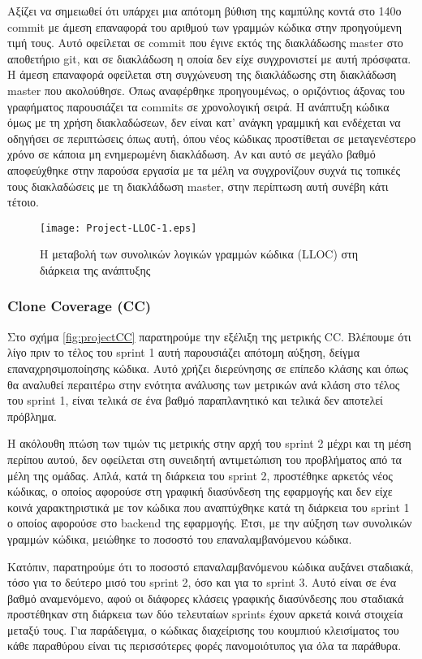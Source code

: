 Αξίζει να σημειωθεί ότι υπάρχει μια απότομη βύθιση της καμπύλης
κοντά στο 140ο commit με άμεση επαναφορά του αριθμού των γραμμών
κώδικα στην προηγούμενη τιμή τους. Αυτό οφείλεται σε commit που
έγινε εκτός της διακλάδωσης master στο αποθετήριο git, και σε
διακλάδωση η οποία δεν είχε συγχρονιστεί με αυτή πρόσφατα. Η
άμεση επαναφορά οφείλεται στη συγχώνευση της διακλάδωσης στη
διακλάδωση master που ακολούθησε. Όπως αναφέρθηκε προηγουμένως, ο
οριζόντιος άξονας του γραφήματος παρουσιάζει τα commits σε
χρονολογική σειρά. Η ανάπτυξη κώδικα όμως με τη χρήση
διακλαδώσεων, δεν είναι κατ’ ανάγκη γραμμική και ενδέχεται να
οδηγήσει σε περιπτώσεις όπως αυτή, όπου νέος κώδικας προστίθεται
σε μεταγενέστερο χρόνο σε κάποια μη ενημερωμένη διακλάδωση. Αν
και αυτό σε μεγάλο βαθμό αποφεύχθηκε στην παρούσα εργασία με τα
μέλη να συγχρονίζουν συχνά τις τοπικές τους διακλαδώσεις με τη
διακλάδωση master, στην περίπτωση αυτή συνέβη κάτι τέτοιο.

\begin{figure}
\centering
\texttt{[image: Project-LLOC-1.eps]}
\caption{Η μεταβολή των συνολικών λογικών γραμμών κώδικα (LLOC) στη διάρκεια της ανάπτυξης}
\label{fig:projectLLOC}
\end{figure}

\subsubsection{Clone Coverage (CC)}

Στο σχήμα \ref{fig:projectCC} παρατηρούμε την εξέλιξη της μετρικής CC.
Βλέπουμε ότι λίγο πριν το τέλος του sprint 1 αυτή παρουσιάζει απότομη
αύξηση, δείγμα επαναχρησιμοποίησης κώδικα. Αυτό χρήζει διερεύνησης σε
επίπεδο κλάσης και όπως θα αναλυθεί περαιτέρω στην ενότητα ανάλυσης των
μετρικών ανά κλάση στο τέλος του sprint 1, είναι τελικά σε ένα βαθμό
παραπλανητικό και τελικά δεν αποτελεί πρόβλημα.

Η ακόλουθη πτώση των τιμών τις μετρικής στην αρχή του sprint 2 μέχρι
και τη μέση περίπου αυτού, δεν οφείλεται στη συνειδητή αντιμετώπιση
του προβλήματος από τα μέλη της ομάδας. Απλά, κατά τη διάρκεια του
sprint 2, προστέθηκε αρκετός νέος κώδικας, ο οποίος αφορούσε στη
γραφική διασύνδεση της εφαρμογής και δεν είχε κοινά χαρακτηριστικά
με τον κώδικα που αναπτύχθηκε κατά τη διάρκεια του sprint 1 ο οποίος
αφορούσε στο backend της εφαρμογής. Έτσι, με την αύξηση των
συνολικών γραμμών κώδικα, μειώθηκε το ποσοστό του επαναλαμβανόμενου
κώδικα.

Κατόπιν, παρατηρούμε ότι το ποσοστό επαναλαμβανόμενου κώδικα αυξάνει
σταδιακά, τόσο για το δεύτερο μισό του sprint 2, όσο και για το
sprint 3. Αυτό είναι σε ένα βαθμό αναμενόμενο, αφού οι διάφορες
κλάσεις γραφικής διασύνδεσης που σταδιακά προστέθηκαν στη διάρκεια
των δύο τελευταίων sprints έχουν αρκετά κοινά στοιχεία μεταξύ τους.
Για παράδειγμα, ο κώδικας διαχείρισης του κουμπιού κλεισίματος του
κάθε παραθύρου είναι τις περισσότερες φορές πανομοιότυπος για όλα τα
παράθυρα.


